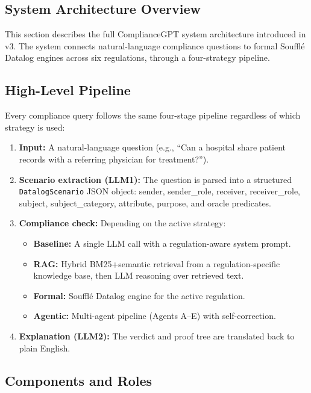 \documentclass[11pt,letterpaper]{article}
\begin{document}
\begin{appendices}
\section{System Architecture Overview}
\label{sec:system-architecture}

This section describes the full ComplianceGPT system architecture introduced in v3. The system connects natural-language compliance questions to formal Souffl\'{e} Datalog engines across six regulations, through a four-strategy pipeline.

\subsection{High-Level Pipeline}

Every compliance query follows the same four-stage pipeline regardless of which strategy is used:

\begin{enumerate}
  \item \textbf{Input:} A natural-language question (e.g., ``Can a hospital share patient records with a referring physician for treatment?'').
  \item \textbf{Scenario extraction (LLM1):} The question is parsed into a structured \texttt{DatalogScenario} JSON object: sender, sender\_role, receiver, receiver\_role, subject, subject\_category, attribute, purpose, and oracle predicates.
  \item \textbf{Compliance check:} Depending on the active strategy:
    \begin{itemize}
      \item \textbf{Baseline:} A single LLM call with a regulation-aware system prompt.
      \item \textbf{RAG:} Hybrid BM25+semantic retrieval from a regulation-specific knowledge base, then LLM reasoning over retrieved text.
      \item \textbf{Formal:} Souffl\'{e} Datalog engine for the active regulation.
      \item \textbf{Agentic:} Multi-agent pipeline (Agents A--E) with self-correction.
    \end{itemize}
  \item \textbf{Explanation (LLM2):} The verdict and proof tree are translated back to plain English.
\end{enumerate}

\subsection{Components and Roles}


\end{appendices}
\end{document}
